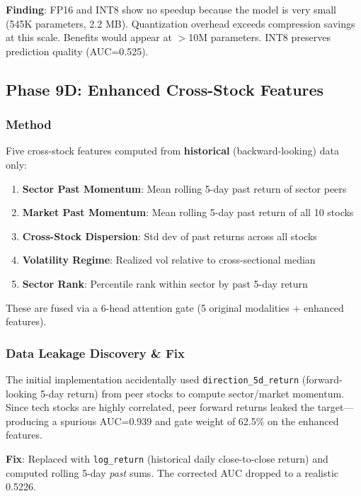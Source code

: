 \documentclass[12pt,a4paper]{article}
\begin{document}
\noindent\textbf{Finding}: FP16 and INT8 show no speedup because the model is very small 
(545K parameters, 2.2 MB). Quantization overhead exceeds compression savings at this scale. 
Benefits would appear at $>$10M parameters. INT8 preserves prediction quality (AUC=0.525).

\subsection{Phase 9D: Enhanced Cross-Stock Features}

\subsubsection{Method}
Five cross-stock features computed from \textbf{historical} (backward-looking) data only:
\begin{enumerate}
    \item \textbf{Sector Past Momentum}: Mean rolling 5-day past return of sector peers
    \item \textbf{Market Past Momentum}: Mean rolling 5-day past return of all 10 stocks
    \item \textbf{Cross-Stock Dispersion}: Std dev of past returns across all stocks
    \item \textbf{Volatility Regime}: Realized vol relative to cross-sectional median
    \item \textbf{Sector Rank}: Percentile rank within sector by past 5-day return
\end{enumerate}

These are fused via a 6-head attention gate (5 original modalities + enhanced features).

\subsubsection{Data Leakage Discovery \& Fix}

The initial implementation accidentally used \texttt{direction\_5d\_return}
(forward-looking 5-day return) from peer stocks to compute sector/market momentum.
Since tech stocks are highly correlated, peer forward returns leaked the target---producing 
a spurious AUC=0.939 and gate weight of 62.5\% on the enhanced features.

\textbf{Fix}: Replaced with \texttt{log\_return} (historical daily close-to-close return) 
and computed rolling 5-day \textit{past} sums. The corrected AUC dropped to a 
realistic 0.5226.
\end{document}
